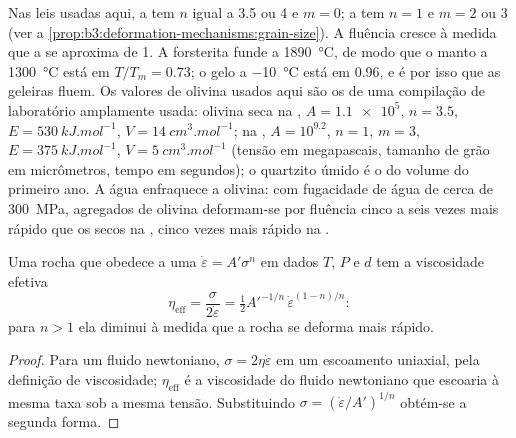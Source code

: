 Nas leis usadas aqui, a  tem $n$ igual a 3.5 ou 4 e $m = 0$;
a  tem $n = 1$ e $m = 2$ ou 3 (ver a \cref{prop:b3:deformation-mechanisms:grain-size}).
A fluência cresce à medida que a  se aproxima de 1. A forsterita funde a \qty{1890}{\celsius}, de modo que o manto a \qty{1300}{\celsius}
está em $T/T_m = 0.73$; o gelo a \qty{-10}{\celsius} está em 0.96, e é por isso que
as geleiras fluem. Os valores de olivina usados aqui são os de uma
compilação de laboratório amplamente usada: olivina seca na , $A =
\num{1.1e5}$, $n = 3.5$, $E = \qty{530}{kJ.mol^{-1}}$, $V =
\qty{14}{cm^3.mol^{-1}}$; na , $A = 10^{9.2}$, $n = 1$, $m = 3$,
$E = \qty{375}{kJ.mol^{-1}}$, $V = \qty{5}{cm^3.mol^{-1}}$ (tensão em megapascais,
tamanho de grão em micrômetros, tempo em segundos); o quartzito úmido é o do
volume do primeiro ano. A água enfraquece a olivina: com fugacidade de água de cerca de
\qty{300}{MPa}, agregados de olivina deformam-se por fluência cinco a seis vezes mais rápido que os secos
na , cinco vezes mais rápido na .

\begin{proposition}\label{prop:b3:deformation-mechanisms:viscosity}
Uma rocha que obedece a uma  $\dot\varepsilon = A'\sigma^n$ em dados $T$, $P$ e
$d$ tem a viscosidade efetiva
\[
  \eta_{\mathrm{eff}} = \frac{\sigma}{2\dot\varepsilon}
  = \tfrac12A'^{-1/n}\,\dot\varepsilon^{(1-n)/n}:
\]
para $n > 1$ ela diminui à medida que a rocha se deforma mais rápido.
\end{proposition}

\begin{proof}
Para um fluido newtoniano, $\sigma = 2\eta\dot\varepsilon$ em um escoamento uniaxial, pela
definição de viscosidade; $\eta_{\mathrm{eff}}$ é a viscosidade do fluido newtoniano que
escoaria à mesma taxa sob a mesma tensão. Substituindo
$\sigma = (\dot\varepsilon/A')^{1/n}$ obtém-se a segunda forma.
\end{proof}

